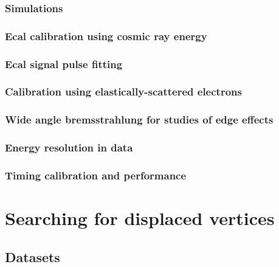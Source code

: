 \documentclass[12pt]{report}
\begin{document}
\subsection{Simulations}


\subsection{Ecal calibration using cosmic ray energy}


\subsection{Ecal signal pulse fitting}


\subsection{Calibration using elastically-scattered electrons}


\subsection{Wide angle bremsstrahlung for studies of edge effects}


\subsection{Energy resolution in data}


\subsection{Timing calibration and performance}


\chapter{Searching for displaced vertices}

\section{Datasets}
\end{document}
